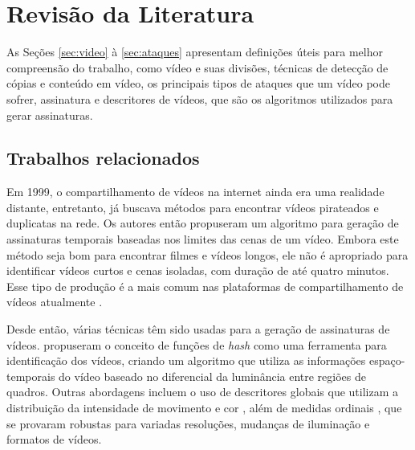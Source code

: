 

\chapter{Revisão da Literatura}
\label{chap:revisao}

As Seções \ref{sec:video} à \ref{sec:ataques} apresentam definições úteis para melhor compreensão do trabalho, como vídeo e suas divisões, técnicas de detecção de cópias e conteúdo em vídeo, os principais tipos de ataques que um vídeo pode sofrer, assinatura e descritores de vídeos, que são os algoritmos utilizados para gerar assinaturas.

\section{Trabalhos relacionados}
\label{chap:relacionados}



Em 1999, o compartilhamento de vídeos na internet ainda era uma realidade distante, entretanto, \citeauthor{indyk1999finding} já buscava métodos para encontrar vídeos pirateados e duplicatas na rede. Os autores então propuseram um algoritmo para geração de assinaturas temporais baseadas nos limites das cenas de um vídeo. Embora este método seja bom para encontrar filmes e vídeos longos, ele não é apropriado para identificar vídeos curtos e cenas isoladas, com duração de até quatro minutos. Esse tipo de produção é a mais comum nas plataformas de compartilhamento de vídeos atualmente \citeauthor{comscoreinc}.

Desde então, várias técnicas têm sido usadas para a geração de assinaturas de vídeos. \citeauthor{coskun2006spatio} propuseram o conceito de funções de \textit{hash} como uma ferramenta para identificação dos vídeos, criando um algoritmo que utiliza as informações espaço-temporais do vídeo baseado no diferencial da luminância entre regiões de quadros. Outras abordagens incluem o uso de descritores globais que utilizam a distribuição da intensidade de movimento e cor \citeauthor{hampapur2001comparison}, além de medidas ordinais \citeauthor{hua2004robust}, que se provaram robustas para variadas resoluções, mudanças de iluminação e formatos de vídeos.	   	


